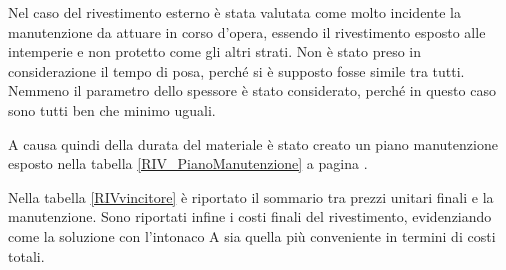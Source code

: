 Nel caso del rivestimento esterno è stata valutata come molto incidente la manutenzione da attuare in corso d'opera, essendo il rivestimento esposto alle intemperie e non protetto come gli altri strati. 
Non è stato preso in considerazione il tempo di posa, perché si è supposto fosse simile tra tutti.
Nemmeno il parametro dello spessore è stato considerato, perché in questo caso sono tutti ben che minimo uguali.

A causa quindi della durata del materiale è stato creato un piano manutenzione esposto nella tabella \ref{RIV_PianoManutenzione} a pagina \pageref{RIV_PianoManutenzione}.

Nella tabella \ref{RIVvincitore} è riportato il sommario tra prezzi unitari finali e la manutenzione. 
Sono riportati infine i costi finali del rivestimento, evidenziando come la soluzione con l'intonaco A sia quella più conveniente in termini di costi totali.

